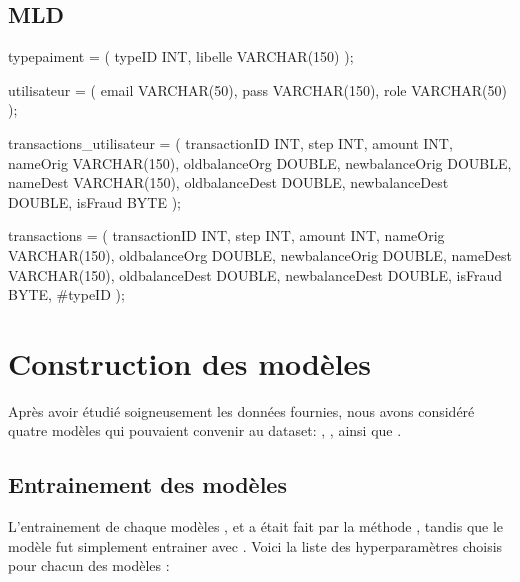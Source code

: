         \subsection{MLD}
            \begin{sqlbox}
                typepaiment = (
                    typeID INT,
                    libelle VARCHAR(150)
                );

                utilisateur = (
                    email VARCHAR(50),
                    pass VARCHAR(150),
                    role VARCHAR(50)
                );

                transactions_utilisateur = (
                    transactionID INT,
                    step INT,
                    amount INT,
                    nameOrig VARCHAR(150),
                    oldbalanceOrg DOUBLE,
                    newbalanceOrig DOUBLE,
                    nameDest VARCHAR(150),
                    oldbalanceDest DOUBLE,
                    newbalanceDest DOUBLE,
                    isFraud BYTE
                );
                    
                transactions = (
                    transactionID INT,
                    step INT,
                    amount INT,
                    nameOrig VARCHAR(150),
                    oldbalanceOrg DOUBLE,
                    newbalanceOrig DOUBLE,
                    nameDest VARCHAR(150),
                    oldbalanceDest DOUBLE,
                    newbalanceDest DOUBLE,
                    isFraud BYTE, 
                    #typeID
                );
            \end{sqlbox}

    \section{Construction des modèles}
        Après avoir étudié soigneusement les données fournies, nous avons considéré quatre modèles qui pouvaient convenir au dataset: , ,  ainsi que .

        \subsection{Entrainement des modèles}
            L'entrainement de chaque modèles ,  et  a était fait par la méthode , tandis que le modèle  fut simplement entrainer avec . Voici la liste des hyperparamètres choisis pour chacun des modèles :
            
